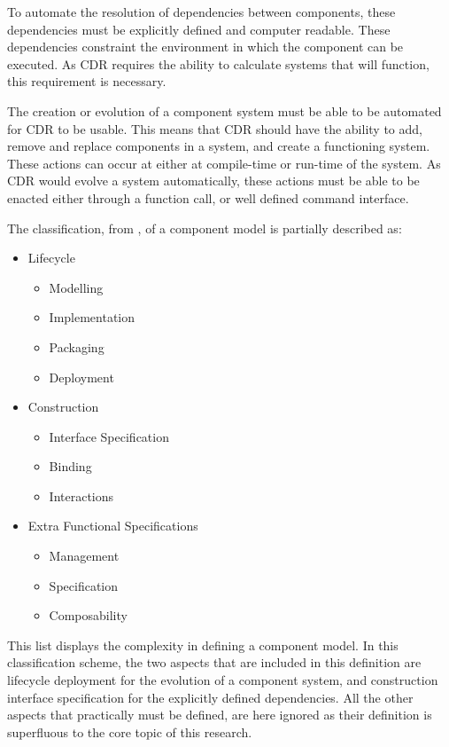 To automate the resolution of dependencies between components, these dependencies must be explicitly defined and computer readable.
These dependencies constraint the environment in which the component can be executed.
As CDR requires the ability to calculate systems that will function, this requirement is necessary.

The creation or evolution of a component system must be able to be automated for CDR to be usable.
This means that CDR should have the ability to add, remove and replace components in a system, and create a functioning system.
These actions can occur at either at compile-time or run-time of the system.
As CDR would evolve a system automatically, these actions must be able to be enacted either through a function call, or well defined command interface.

The classification, from \cite{Crnkovic2011}, of a component model is partially described as:
\begin{itemize}
  \item Lifecycle 
  		\begin{itemize}
	  		\item Modelling
	  		\item Implementation
	  		\item Packaging
	  		\item Deployment
		\end{itemize}
	\item Construction
		\begin{itemize}
	  		\item Interface Specification
	  		\item Binding
	  		\item Interactions 
		\end{itemize}
	\item Extra Functional Specifications
		\begin{itemize}
	  		\item Management
	  		\item Specification
	  		\item Composability
		\end{itemize}	
\end{itemize}  
This list displays the complexity in defining a component model.
In this classification scheme, the two aspects that are included in this definition are lifecycle deployment for the evolution of a component system, 
and construction interface specification for the explicitly defined dependencies.
All the other aspects that practically must be defined, are here ignored as their definition is superfluous to the core topic of this research.

